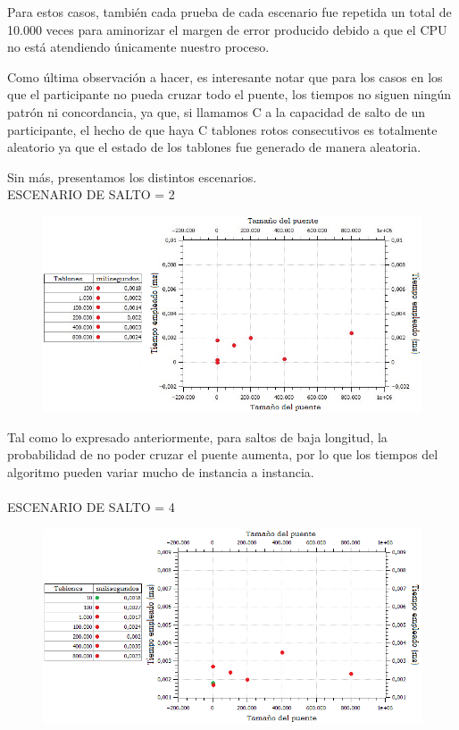 \documentclass[10pt,a4paper]{article}
\begin{document}
\noindent Para estos casos, también cada prueba de cada escenario fue repetida un total de 10.000 veces para aminorizar el margen de error producido debido a que el CPU no está atendiendo únicamente nuestro proceso.

\noindent Como última observación a hacer, es interesante notar que para los casos en los que el participante no pueda cruzar todo el puente, los tiempos no siguen ningún patrón ni concordancia, ya que, si llamamos C a la capacidad de salto de un participante, el hecho de que haya C tablones rotos consecutivos es totalmente aleatorio ya que el estado de los tablones fue generado de manera aleatoria.

\noindent Sin más, presentamos los distintos escenarios.\\

\newpage \indent ESCENARIO DE SALTO = 2

	\begin{figure}[h]
		\begin{center}
		   \includegraphics[scale=0.75]{casosDeTest/GRAFICOS/png/randoms/ej1_random_salto2.png}
		\end{center}
	\end{figure}

Tal como lo expresado anteriormente, para saltos de baja longitud, la probabilidad de no poder cruzar el puente aumenta, por lo que los tiempos del algoritmo pueden variar mucho de instancia a instancia. \\ \\

\indent ESCENARIO DE SALTO = 4
	\begin{figure}[h]
		\begin{center}
		   \includegraphics[scale=0.75]{casosDeTest/GRAFICOS/png/randoms/ej1_random_salto4.png}
		\end{center}
	\end{figure}
\end{document}
